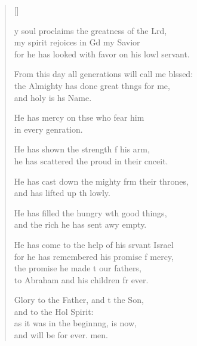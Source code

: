 \settowidth{\versewidth}{From this day all generations will call me blessed: +}
\begin{verse}[\versewidth]
  \begin{patverse}
y soul proclaims the greatness of the Lrd,\Flex\\
my spirit rejoices in Gd my Savior\Med\\
for he has looked with favor on his lowl servant.

From this day all generations will call me blssed:\Flex\\
the Almighty has done great th\pointup{\i}ngs for me,\Med\\
and holy is h\pointup{\i}s Name.

He has mercy on thse who fear him\Med\\
in every genration.

He has shown the strength f his arm,\Med\\
he has scattered the proud in their cnceit.

He has cast down the mighty frm their thrones,\Med\\
and has lifted up th lowly.

He has filled the hungry w\pointup{\i}th good things,\Med\\
and the rich he has sent awy empty.

He has come to the help of his srvant Israel\Med\\
for he has remembered his promise f mercy,\\
the promise he made t our fathers,\Med\\
to Abraham and his children fr ever.

Glory to the Father, and t the Son,\Med\\
and to the Hol Spirit:\\
as it was in the beginn\pointup{\i}ng, is now,\Med\\
and will be for ever. men.
  \end{patverse}
\end{verse}
